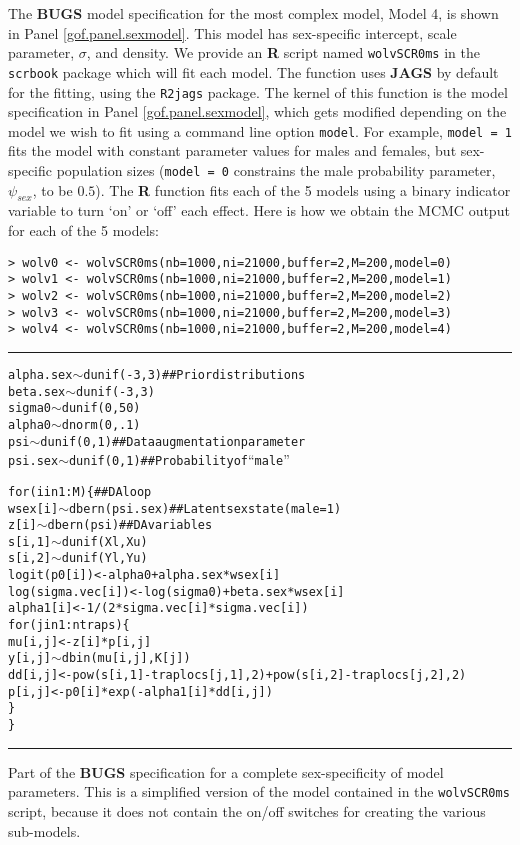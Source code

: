 The {\bf BUGS} model specification for the
most complex model, Model 4, is shown in Panel
\ref{gof.panel.sexmodel}.  This model has sex-specific intercept,
scale parameter, $\sigma$, and density.  We provide an {\bf R} script named
\mbox{\tt wolvSCR0ms} in the \mbox{\tt scrbook} package which will fit
each model.  The function uses {\bf JAGS} by default for the fitting,
using the \mbox{\tt R2jags} package.  The kernel of this function is
the model specification in Panel \ref{gof.panel.sexmodel}, which gets
modified depending on the model we wish to fit using a command line
option \mbox{\tt model}. For example, \mbox{\tt model = 1} fits the
model with constant parameter values for males and females, but
sex-specific population sizes (\mbox{\tt model = 0} constrains the
male probability parameter, $\psi_{sex}$, to be $0.5$).  The {\bf R} function
fits each of the 5 models using a binary indicator variable to turn
`on' or `off' each effect.  Here is how we obtain the MCMC output for
each of the 5 models: {\small
\begin{verbatim}
> wolv0 <- wolvSCR0ms(nb=1000,ni=21000,buffer=2,M=200,model=0)
> wolv1 <- wolvSCR0ms(nb=1000,ni=21000,buffer=2,M=200,model=1)
> wolv2 <- wolvSCR0ms(nb=1000,ni=21000,buffer=2,M=200,model=2)
> wolv3 <- wolvSCR0ms(nb=1000,ni=21000,buffer=2,M=200,model=3)
> wolv4 <- wolvSCR0ms(nb=1000,ni=21000,buffer=2,M=200,model=4)
\end{verbatim}
}



\begin{panel}[tp]
\centering
\rule[0.15in]{\textwidth}{.03in}
{\small
\begin{alltt}
alpha.sex \(\sim\) dunif(-3,3)            ## Prior distributions 
beta.sex  \(\sim\) dunif(-3,3)
sigma0 \(\sim\) dunif(0,50)
alpha0 \(\sim\) dnorm(0,.1)
psi \(\sim\) dunif(0,1)                   ## Data augmentation parameter
psi.sex  \(\sim\) dunif(0,1)              ## Probability of ``male''

for(i in 1:M)\{                      ## DA loop
  wsex[i] \(\sim\) dbern(psi.sex)         ## Latent sex state (male = 1)
  z[i] \(\sim\) dbern(psi)                ## DA variables
  s[i,1] \(\sim\) dunif(Xl,Xu)
  s[i,2] \(\sim\) dunif(Yl,Yu)
  logit(p0[i]) <- alpha0 + alpha.sex*wsex[i]
  log(sigma.vec[i]) <- log(sigma0) + beta.sex*wsex[i]
  alpha1[i] <- 1/(2*sigma.vec[i]*sigma.vec[i])
  for(j in 1:ntraps)\{
    mu[i,j] <- z[i]*p[i,j]
    y[i,j] \(\sim\) dbin(mu[i,j],K[j])
    dd[i,j] <- pow(s[i,1] - traplocs[j,1],2)  + pow(s[i,2] - traplocs[j,2],2)
    p[i,j]  <-  p0[i]*exp( - alpha1[i]*dd[i,j] )
   \}
 \}
\end{alltt}
}
\rule[-0.15in]{\textwidth}{.03in}
\caption{
Part of the {\bf BUGS} specification for a complete sex-specificity of model
parameters. This is a simplified version of the model contained in the 
\mbox{\tt wolvSCR0ms} script, because it does not contain the on/off
switches for creating the various sub-models. 
}
\label{gof.panel.sexmodel}
\end{panel}


